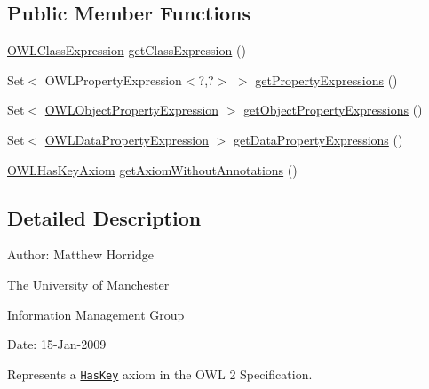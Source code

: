 \subsection*{Public Member Functions}
\begin{DoxyCompactItemize}
\item 
\hyperlink{interfaceorg_1_1semanticweb_1_1owlapi_1_1model_1_1_o_w_l_class_expression}{O\-W\-L\-Class\-Expression} \hyperlink{interfaceorg_1_1semanticweb_1_1owlapi_1_1model_1_1_o_w_l_has_key_axiom_abe22fc1fdbdce611e903a067b78ed2ad}{get\-Class\-Expression} ()
\item 
Set$<$ O\-W\-L\-Property\-Expression$<$?,?$>$ $>$ \hyperlink{interfaceorg_1_1semanticweb_1_1owlapi_1_1model_1_1_o_w_l_has_key_axiom_a5d04c1acd26caf0efde94253a42796ab}{get\-Property\-Expressions} ()
\item 
Set$<$ \hyperlink{interfaceorg_1_1semanticweb_1_1owlapi_1_1model_1_1_o_w_l_object_property_expression}{O\-W\-L\-Object\-Property\-Expression} $>$ \hyperlink{interfaceorg_1_1semanticweb_1_1owlapi_1_1model_1_1_o_w_l_has_key_axiom_acf4bc04c33c2762681b3c86cafc0a0b5}{get\-Object\-Property\-Expressions} ()
\item 
Set$<$ \hyperlink{interfaceorg_1_1semanticweb_1_1owlapi_1_1model_1_1_o_w_l_data_property_expression}{O\-W\-L\-Data\-Property\-Expression} $>$ \hyperlink{interfaceorg_1_1semanticweb_1_1owlapi_1_1model_1_1_o_w_l_has_key_axiom_a59ca1923bfbc5dfccaf48dea30542894}{get\-Data\-Property\-Expressions} ()
\item 
\hyperlink{interfaceorg_1_1semanticweb_1_1owlapi_1_1model_1_1_o_w_l_has_key_axiom}{O\-W\-L\-Has\-Key\-Axiom} \hyperlink{interfaceorg_1_1semanticweb_1_1owlapi_1_1model_1_1_o_w_l_has_key_axiom_a6f8d1a901303f321a2e50410a62a5d36}{get\-Axiom\-Without\-Annotations} ()
\end{DoxyCompactItemize}


\subsection{Detailed Description}
Author\-: Matthew Horridge\par
 The University of Manchester\par
 Information Management Group\par
 Date\-: 15-\/\-Jan-\/2009 

Represents a \href{http://www.w3.org/TR/2009/REC-owl2-syntax-20091027/#Keys}{\tt Has\-Key} axiom in the O\-W\-L 2 Specification. 

